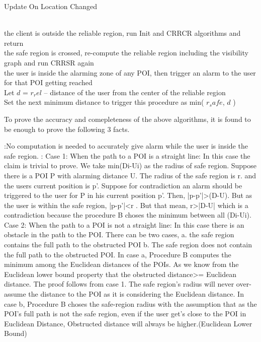 \documentclass{sig-alternate}
\begin{document}
\begin{algorithm}
\caption{Update On Location Changed}
\label{ULC}
\begin{algorithmic}[2]

\\ \if the client is outside the reliable region, \then run Init and CRRCR algorithms and return
\\ \if the safe region is crossed, \then re-compute the reliable region including the visibility graph and run CRRSR again
\\ \if the user is inside the alarming zone of any POI, then trigger an alarm to the user for that POI getting reached
\\ Let $d$ = $r_rel$ – distance of the user from the center of the reliable region
\\ Set the next minimum distance to trigger this procedure as min( $r_safe$, $d$ )

\EndProcedure
\end{algorithmic}
\end{algorithm}

To prove the accuracy and comepleteness of the above algorithms, it is found to be enough to prove the following 3 facts.

:No computation is needed to accurately give alarm while the user is inside the safe region.
: 
Case 1: When the path to a POI is a straight line: 
In this case the claim is trivial to prove. We take min(Di-Ui) as the radius of safe region. Suppose there is a POI P with alarming distance U. The radius of the safe region is r. and the users current position is p’. Suppose for contradiction an alarm should be triggered to the user for P in his current position p’. Then, |p-p’|>(D-U). But as the user is within the safe region, |p-p’|<r . But that mean, r>|D-U| which is a contradiction because the procedure B choses the minimum between all (Di-Ui).
Case 2: When the path to a POI is not a straight line: 
In this case there is an obstacle in the path to the POI. There can be two cases, 
a. the safe region contains the full path to the obstructed POI 
b. The safe region does not contain the full path to the obstructed POI.
In case a, Procedure B computes the minimum among the Euclidean distances of the POIs. As we know from the Euclidean lower bound property that the obstructed distance>= Euclidean distance. The proof follows from case 1. The safe region’s radius will never over-assume the distance to the POI as it is considering the Euclidean distance.
In case b, Procedure B choses the safe-region radius with the assumption that as the POI’s full path is not the safe region, even if the user get’s close to the POI in Euclidean Distance, Obstructed distance will always be higher.(Euclidean Lower Bound)
\end{document}
